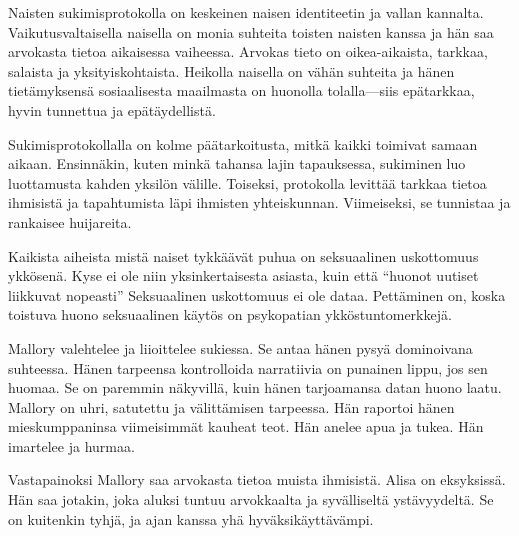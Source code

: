 Naisten sukimisprotokolla on keskeinen naisen identiteetin ja vallan kannalta. Vaikutusvaltaisella naisella on monia suhteita toisten naisten kanssa ja hän saa arvokasta tietoa aikaisessa vaiheessa. Arvokas tieto on oikea-aikaista, tarkkaa, salaista ja yksityiskohtaista. Heikolla naisella on vähän suhteita ja hänen tietämyksensä sosiaalisesta maailmasta on huonolla tolalla---siis epätarkkaa, hyvin tunnettua ja epätäydellistä.

Sukimisprotokollalla on kolme päätarkoitusta, mitkä kaikki toimivat samaan aikaan. Ensinnäkin, kuten minkä tahansa lajin tapauksessa, sukiminen luo luottamusta kahden yksilön välille. Toiseksi, protokolla levittää tarkkaa tietoa ihmisistä ja tapahtumista läpi ihmisten yhteiskunnan. Viimeiseksi, se tunnistaa ja rankaisee huijareita.

Kaikista aiheista mistä naiset tykkäävät puhua on seksuaalinen uskottomuus ykkösenä. Kyse ei ole niin yksinkertaisesta asiasta, kuin että ``huonot uutiset liikkuvat nopeasti'' Seksuaalinen uskottomuus ei ole dataa. Pettäminen on, koska toistuva huono seksuaalinen käytös on psykopatian ykköstuntomerkkejä.

Mallory valehtelee ja liioittelee sukiessa. Se antaa hänen pysyä dominoivana suhteessa. Hänen tarpeensa kontrolloida narratiivia on punainen lippu, jos sen huomaa. Se on paremmin näkyvillä, kuin hänen tarjoamansa datan huono laatu. Mallory on uhri, satutettu ja välittämisen tarpeessa. Hän raportoi hänen mieskumppaninsa viimeisimmät kauheat teot. Hän anelee apua ja tukea. Hän imartelee ja hurmaa.

Vastapainoksi Mallory saa arvokasta tietoa muista ihmisistä. Alisa on eksyksissä. Hän saa jotakin, joka aluksi tuntuu arvokkaalta ja syvälliseltä ystävyydeltä. Se on kuitenkin tyhjä, ja ajan kanssa yhä hyväksikäyttävämpi.

